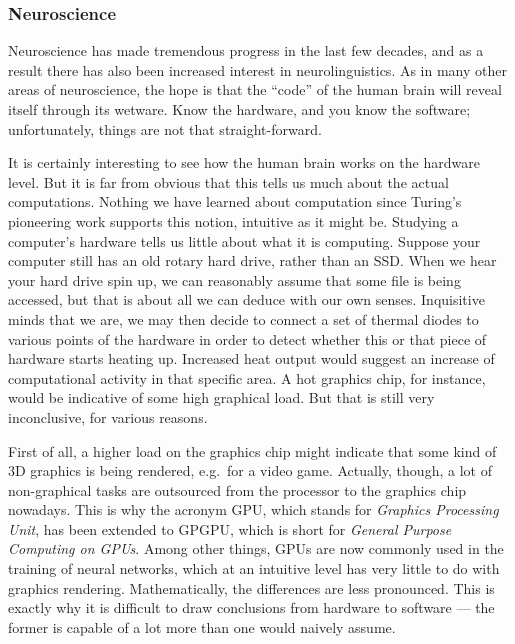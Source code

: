 \subsubsection{Neuroscience}
\label{sub:formal_arguments_science_neuro}

Neuroscience has made tremendous progress in the last few decades, and as a result there has also been increased interest in neurolinguistics.
As in many other areas of neuroscience, the hope is that the ``code'' of the human brain will reveal itself through its wetware.
Know the hardware, and you know the software; unfortunately, things are not that straight-forward.

It is certainly interesting to see how the human brain works on the hardware level.
But it is far from obvious that this tells us much about the actual computations.
Nothing we have learned about computation since Turing's pioneering work supports this notion, intuitive as it might be.
Studying a computer's hardware tells us little about what it is computing.
Suppose your computer still has an old rotary hard drive, rather than an SSD\@.
When we hear your hard drive spin up, we can reasonably assume that some file is being accessed, but that is about all we can deduce with our own senses.
Inquisitive minds that we are, we may then decide to connect a set of thermal diodes to various points of the hardware in order to detect whether this or that piece of hardware starts heating up.
Increased heat output would suggest an increase of computational activity in that specific area.
A hot graphics chip, for instance, would be indicative of some high graphical load.
But that is still very inconclusive, for various reasons.

First of all, a higher load on the graphics chip might indicate that some kind of 3D graphics is being rendered, e.g.~for a video game.
Actually, though, a lot of non-graphical tasks are outsourced from the processor to the graphics chip nowadays.
This is why the acronym GPU, which stands for \emph{Graphics Processing Unit}, has been extended to GPGPU, which is short for \emph{General Purpose Computing on GPUs}.
Among other things, GPUs are now commonly used in the training of neural networks, which at an intuitive level has very little to do with graphics rendering.
Mathematically, the differences are less pronounced.
This is exactly why it is difficult to draw conclusions from hardware to software --- the former is capable of a lot more than one would naively assume.


